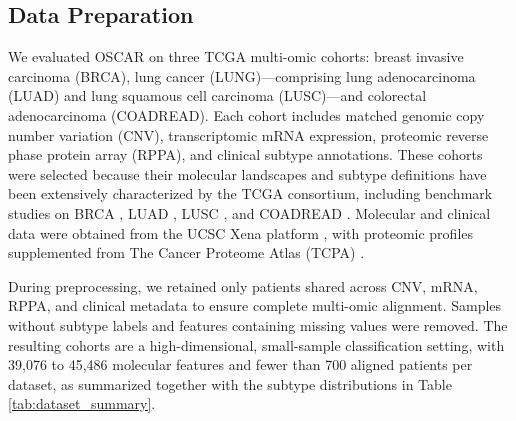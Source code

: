 \documentclass[lettersize,journal]{IEEEtran}
\begin{document}
\subsection{Data Preparation}
We evaluated OSCAR on three TCGA multi-omic cohorts: breast invasive carcinoma (BRCA), lung cancer (LUNG)---comprising lung adenocarcinoma (LUAD) and lung squamous cell carcinoma (LUSC)---and colorectal adenocarcinoma (COADREAD). Each cohort includes matched genomic copy number variation (CNV), transcriptomic mRNA expression, proteomic reverse phase protein array (RPPA), and clinical subtype annotations. These cohorts were selected because their molecular landscapes and subtype definitions have been extensively characterized by the TCGA consortium, including benchmark studies on BRCA \cite{Koboldt2012BRCA}, LUAD \cite{TCGA2014LUAD}, LUSC \cite{TCGA2012LUSC}, and COADREAD \cite{TCGA2012COADREAD}. Molecular and clinical data were obtained from the UCSC Xena platform \cite{Goldman2020Xena}, with proteomic profiles supplemented from The Cancer Proteome Atlas (TCPA) \cite{Li2013TCPA}.

During preprocessing, we retained only patients shared across CNV, mRNA, RPPA, and clinical metadata to ensure complete multi-omic alignment. Samples without subtype labels and features containing missing values were removed. The resulting cohorts are a high-dimensional, small-sample classification setting, with 39,076 to 45,486 molecular features and fewer than 700 aligned patients per dataset, as summarized together with the subtype distributions in Table \ref{tab:dataset_summary}. 
\end{document}
